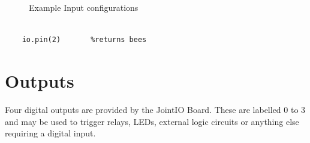 \documentclass[a4paper, 12pt]{article}
\begin{document}
\begin{figure}[h]
\centering
{}
\hspace{60pt}
\caption{Example Input configurations}
\label{fig:inputs}
\end{figure}


\begin{python}
\begin{verbatim}

	io.pin(2) 		%returns bees 

\end{verbatim}
  \caption{Reading the value of io input pins} 
\end{python}


\section{Outputs}
Four digital outputs are provided by the JointIO Board. These are labelled 0 to 3 and may be used to trigger relays, LEDs, external logic circuits or anything else requiring a digital input. 
\end{document}
